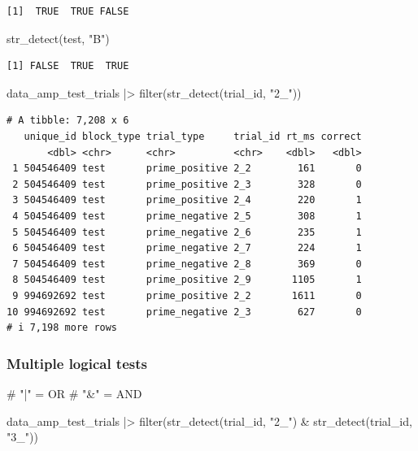 \documentclass[
  letterpaper,
  DIV=11,
  numbers=noendperiod]{scrreprt}
\newenvironment{Shaded}{\begin{snugshade}}{\end{snugshade}}
\newcommand{\CommentTok}[1]{\textcolor[rgb]{0.37,0.37,0.37}{#1}}
\newcommand{\FunctionTok}[1]{\textcolor[rgb]{0.28,0.35,0.67}{#1}}
\newcommand{\NormalTok}[1]{\textcolor[rgb]{0.00,0.23,0.31}{#1}}
\newcommand{\SpecialCharTok}[1]{\textcolor[rgb]{0.37,0.37,0.37}{#1}}
\newcommand{\StringTok}[1]{\textcolor[rgb]{0.13,0.47,0.30}{#1}}
\begin{document}
\begin{verbatim}
[1]  TRUE  TRUE FALSE
\end{verbatim}

\begin{Shaded}
\begin{Highlighting}[]
\FunctionTok{str\_detect}\NormalTok{(test, }\StringTok{"B"}\NormalTok{)}
\end{Highlighting}
\end{Shaded}

\begin{verbatim}
[1] FALSE  TRUE  TRUE
\end{verbatim}

\begin{Shaded}
\begin{Highlighting}[]
\NormalTok{data\_amp\_test\_trials }\SpecialCharTok{|\textgreater{}}
  \FunctionTok{filter}\NormalTok{(}\FunctionTok{str\_detect}\NormalTok{(trial\_id, }\StringTok{"2\_"}\NormalTok{)) }
\end{Highlighting}
\end{Shaded}

\begin{verbatim}
# A tibble: 7,208 x 6
   unique_id block_type trial_type     trial_id rt_ms correct
       <dbl> <chr>      <chr>          <chr>    <dbl>   <dbl>
 1 504546409 test       prime_positive 2_2        161       0
 2 504546409 test       prime_positive 2_3        328       0
 3 504546409 test       prime_positive 2_4        220       1
 4 504546409 test       prime_negative 2_5        308       1
 5 504546409 test       prime_negative 2_6        235       1
 6 504546409 test       prime_negative 2_7        224       1
 7 504546409 test       prime_negative 2_8        369       0
 8 504546409 test       prime_positive 2_9       1105       1
 9 994692692 test       prime_positive 2_2       1611       0
10 994692692 test       prime_negative 2_3        627       0
# i 7,198 more rows
\end{verbatim}

\subsubsection{Multiple logical tests}\label{multiple-logical-tests}

\begin{Shaded}
\begin{Highlighting}[]
\CommentTok{\# "|" = OR}
\CommentTok{\# "\&" = AND}

\NormalTok{data\_amp\_test\_trials }\SpecialCharTok{|\textgreater{}}
  \FunctionTok{filter}\NormalTok{(}\FunctionTok{str\_detect}\NormalTok{(trial\_id, }\StringTok{"2\_"}\NormalTok{) }\SpecialCharTok{\&}
           \FunctionTok{str\_detect}\NormalTok{(trial\_id, }\StringTok{"3\_"}\NormalTok{))}
\end{Highlighting}
\end{Shaded}
\end{document}

